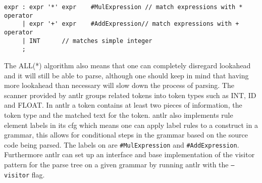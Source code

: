 \begin{lstlisting}[caption=An ambiguous rule for expr,frame=tlrb,label={lst:amb}]
expr : expr '*' expr 	#MulExpression // match expressions with * operator
     | expr '+' expr 	#AddExpression// match expressions with + operator
     | INT 		// matches simple integer
     ;
\end{lstlisting}

The ALL(*) algorithm also means that one can completely disregard lookahead and it will still be able to parse, although one should keep in mind that having more lookahead than necessary will slow down the process of parsing.
The scanner provided by \acrshort{antlr} groups related tokens into token types such as INT, ID and FLOAT.
In \acrshort{antlr} a token contains at least two pieces of information, the token type and the matched text for the token.
\acrshort{antlr} also implements rule element labels in its \acrfull{cfg} which means one can apply label rules to a construct in a grammar, this allows for conditional steps in the grammar based on the source code being parsed.
The labels on  are \texttt{\#MulExpression} and \texttt{\#AddExpression}.
Furthermore \acrshort{antlr} can set up an interface and base implementation of the visitor pattern for the parse tree on a given grammar by running \acrshort{antlr} with the \texttt{--visitor} flag. \citep{ALLSTAR, LLSTAR, antlr4_Book}
